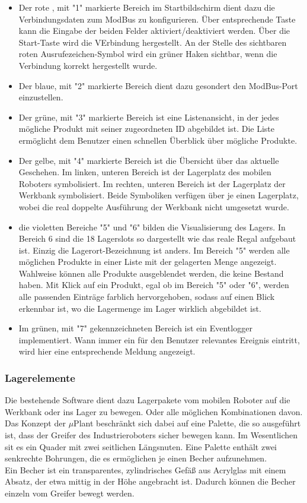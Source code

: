 \documentclass[11pt]{scrartcl}
\begin{document}
    \begin{itemize}
        \item Der rote , mit "1" markierte Bereich im Startbildschirm dient dazu die Verbindungsdaten zum ModBus zu konfigurieren. Über entsprechende Taste kann die Eingabe der beiden Felder aktiviert/deaktiviert werden. Über die Start-Taste wird die VErbindung hergestellt.
        An der Stelle des sichtbaren roten Ausrufezeichen-Symbol wird ein grüner Haken sichtbar, wenn die Verbindung korrekt hergestellt wurde.
        \item Der blaue, mit "2" markierte Bereich dient dazu gesondert den ModBus-Port einzustellen.
        \item Der grüne, mit "3" markierte Bereich ist eine Listenansicht, in der jedes mögliche Produkt mit seiner zugeordneten ID abgebildet ist.
        Die Liste ermöglicht dem Benutzer einen schnellen Überblick über mögliche Produkte.
        \item Der gelbe, mit "4" markierte Bereich ist die Übersicht über das aktuelle Geschehen. Im linken, unteren Bereich ist der Lagerplatz des mobilen Roboters symbolisiert.
        Im rechten, unteren Bereich ist der Lagerplatz der Werkbank symbolisiert. Beide Symboliken verfügen über je einen Lagerplatz, wobei die real doppelte Ausführung der Werkbank nicht umgesetzt wurde.
        \item die violetten Bereiche "5" und "6" bilden die Visualisierung des Lagers. In Bereich 6 sind die 18 Lagerslots so dargestellt wie das reale Regal aufgebaut ist. Einzig die Lagerort-Bezeichnung ist anders.
        Im Bereich "5" werden alle möglichen Produkte in einer Liste mit der gelagerten Menge angezeigt. Wahlweise können alle Produkte ausgeblendet werden, die keine Bestand haben.
        Mit Klick auf ein Produkt, egal ob im Bereich "5" oder "6", werden alle passenden Einträge farblich hervorgehoben, sodass auf einen Blick erkennbar ist, wo die Lagermenge im Lager wirklich abgebildet ist.
        \item Im grünen, mit "7" gekennzeichneten Bereich ist ein Eventlogger implementiert. Wann immer ein für den Benutzer relevantes Ereignis eintritt, wird hier eine entsprechende Meldung angezeigt.
    \end{itemize}
    \subsubsection{Lagerelemente}
        Die bestehende Software dient dazu Lagerpakete vom mobilen Roboter auf die Werkbank oder ins Lager zu bewegen. Oder alle möglichen Kombinationen davon.
    Das Konzept der $\mu$Plant beschränkt sich dabei auf eine Palette, die so ausgeführt ist, dass der Greifer des Industrieroboters sicher bewegen kann. Im Wesentlichen sit es ein Quader mit zwei seitlichen Längsnuten.
    Eine Palette enthält zwei senkrechte Bohrungen, die es ermöglichen je einen Becher aufzunehmen.\\
    Ein Becher ist ein transparentes, zylindrisches Gefäß aus Acrylglas mit einem Absatz, der etwa mittig in der Höhe angebracht ist. Dadurch können die Becher einzeln vom Greifer bewegt werden.
\end{document}
